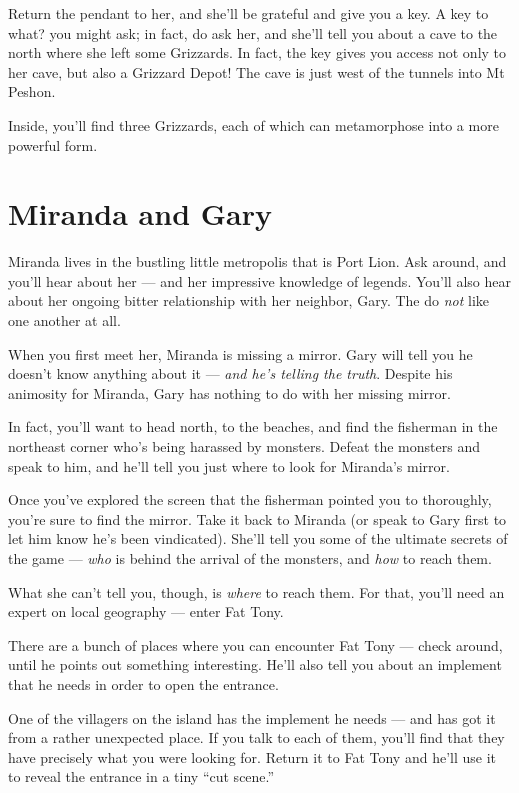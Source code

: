 \documentclass[10pt,twocolumn]{memoir}
\begin{document}
Return the pendant  to her, and she'll  be grateful and give  you a key.
A key to what?  you might ask; in fact, do ask her,  and she'll tell you
about a cave  to the north where  she left some Grizzards.  In fact, the
key gives you  access not only to  her cave, but also  a Grizzard Depot!
The cave is just west of the tunnels into Mt Peshon.

Inside, you'll find three Grizzards, each of which can metamorphose into
a more powerful form.

\section{Miranda and Gary}

Miranda  lives in  the bustling  little  metropolis that  is Port  Lion.
Ask around, and  you'll hear about her --- and  her impressive knowledge
of legends. You'll also hear  about her ongoing bitter relationship with
her neighbor, Gary. The do \emph{not} like one another at all.

When you first meet her, Miranda is missing a mirror. Gary will tell you
he doesn't know anything about it --- \emph{and he's telling the truth}.
Despite  his animosity  for Miranda,  Gary has  nothing to  do with  her
missing mirror.

In  fact, you'll  want  to head  north,  to the  beaches,  and find  the
fisherman  in the  northeast corner  who's being  harassed by  monsters.
Defeat the monsters and  speak to him, and he'll tell  you just where to
look for Miranda's mirror.

Once  you've explored  the  screen  that the  fisherman  pointed you  to
thoroughly, you're sure to find the  mirror. Take it back to Miranda (or
speak to Gary  first to let him know he's  been vindicated). She'll tell
you some  of the ultimate secrets  of the game ---  \emph{who} is behind
the arrival of the monsters, and \emph{how} to reach them.

What  she  can't  tell  you,  though, is  \emph{where}  to  reach  them.
For that, you'll need an expert on local geography --- enter Fat Tony.

There are a bunch  of places where you can encounter  Fat Tony --- check
around, until he  points out something interesting. He'll  also tell you
about an implement that he needs in order to open the entrance.

One of the  villagers on the island  has the implement he  needs --- and
has got it from a rather unexpected  place. If you talk to each of them,
you'll  find  that  they  have  precisely what  you  were  looking  for.
Return it to Fat Tony and he'll use  it to reveal the entrance in a tiny
``cut scene.''
\end{document}
